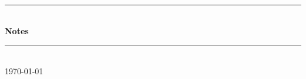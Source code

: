 \documentclass[14pt]{article}
\begin{document}
\begin{titlepage}



\newcommand{\HRule}{\rule{\linewidth}{0.5mm}} %

\center %
 



\HRule \\[0.4cm]
{ \huge \bfseries Notes}\\[0.4cm] %
\HRule \\[1.5cm]
 


{\large \today}\\[3cm] %


 

\vfill %

\end{titlepage}
\end{document}
